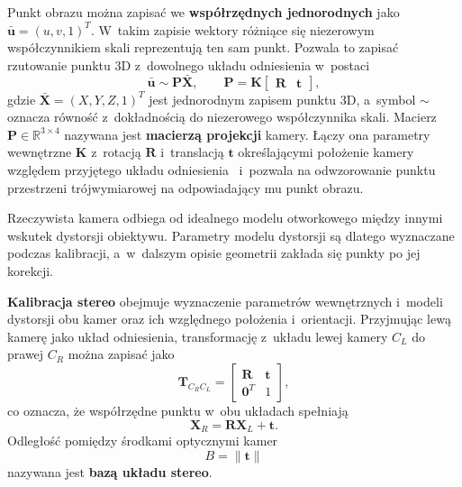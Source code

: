 Punkt obrazu można zapisać we \textbf{współrzędnych jednorodnych} jako
$\bar{\mathbf{u}}=(u,v,1)^T$. W~takim zapisie wektory różniące się niezerowym współczynnikiem skali reprezentują ten sam punkt. Pozwala to zapisać rzutowanie punktu 3D z~dowolnego układu odniesienia w~postaci
\begin{equation}
\bar{\mathbf{u}}
\sim
\mathbf{P}\bar{\mathbf{X}},
\qquad
\mathbf{P}
=
\mathbf{K}
\begin{bmatrix}
\mathbf{R} & \mathbf{t}
\end{bmatrix},
\label{eq:camera_projection_matrix}
\end{equation}
gdzie $\bar{\mathbf{X}}=(X,Y,Z,1)^T$ jest jednorodnym zapisem punktu 3D, a~symbol $\sim$ oznacza równość z~dokładnością do niezerowego współczynnika skali. Macierz $\mathbf{P}\in\mathbb{R}^{3\times4}$ nazywana jest \textbf{macierzą projekcji} kamery. Łączy ona parametry wewnętrzne $\mathbf{K}$ z~rotacją $\mathbf{R}$ i~translacją $\mathbf{t}$ określającymi położenie kamery względem przyjętego układu odniesienia~\cite{fusiello2000rectification} i~pozwala na odwzorowanie punktu przestrzeni trójwymiarowej na odpowiadający mu punkt obrazu.

Rzeczywista kamera odbiega od idealnego modelu otworkowego między innymi wskutek dystorsji obiektywu. Parametry modelu dystorsji są dlatego wyznaczane podczas kalibracji, a~w~dalszym opisie geometrii zakłada się punkty po jej korekcji.

\textbf{Kalibracja stereo} obejmuje wyznaczenie parametrów wewnętrznych i~modeli dystorsji obu kamer oraz ich względnego położenia i~orientacji. Przyjmując lewą kamerę jako układ odniesienia, transformację z~układu lewej kamery $C_L$ do prawej $C_R$ można zapisać jako
\begin{equation}
\mathbf{T}_{C_R C_L}
=
\begin{bmatrix}
\mathbf{R} & \mathbf{t}\\
\mathbf{0}^T & 1
\end{bmatrix},
\label{eq:stereo_extrinsics}
\end{equation}
co oznacza, że współrzędne punktu w~obu układach spełniają
\begin{equation}
\mathbf{X}_R
=
\mathbf{R}\mathbf{X}_L+\mathbf{t}.
\label{eq:stereo_relative_pose}
\end{equation}
Odległość pomiędzy środkami optycznymi kamer
\begin{equation}
B=\|\mathbf{t}\|
\label{eq:stereo_baseline}
\end{equation}
nazywana jest \textbf{bazą układu stereo}.

